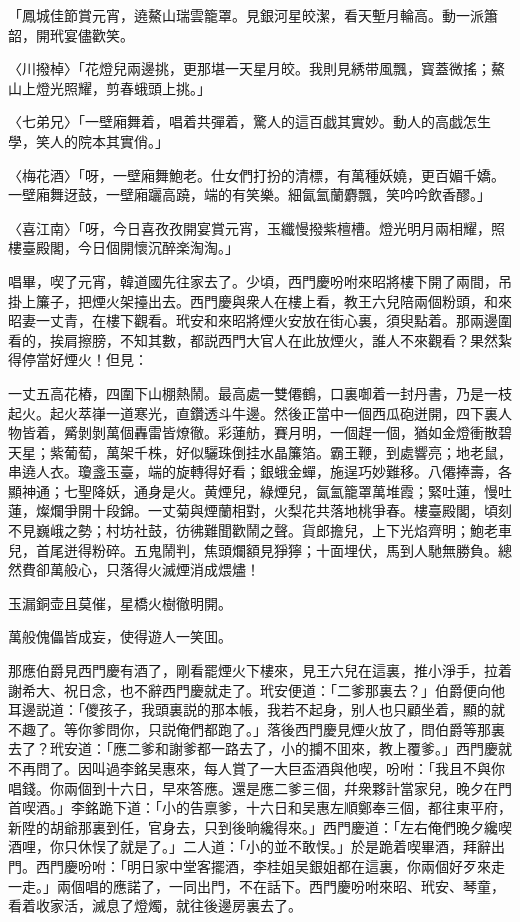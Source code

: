 「鳳城佳節賞元宵，遶鰲山瑞雲籠罩。見銀河星皎潔，看天塹月輪高。動一派簫韶，開玳宴儘歡笑。

〈川撥棹〉「花燈兒兩邊挑，更那堪一天星月皎。我則見綉带風飄，寳蓋微搖；鰲山上燈光照耀，剪春蛾頭上挑。」

〈七弟兄〉「一壁廂舞着，唱着共彈着，驚人的這百戯其實妙。動人的高戯怎生學，笑人的院本其實俏。」

〈梅花酒〉「呀，一壁廂舞鮑老。仕女們打扮的清標，有萬種妖嬈，更百媚千嬌。一壁廂舞迓鼓，一壁廂躧高蹺，端的有笑樂。細氤氳蘭麝飄，笑吟吟飲香醪。」

〈喜江南〉「呀，今日喜孜孜開宴賞元宵，玉纖慢撥紫檀槽。燈光明月兩相耀，照樓臺殿閣，今日個開懷沉醉楽淘淘。」

唱畢，喫了元宵，韓道國先往家去了。少頃，西門慶吩咐來昭將樓下開了兩間，吊掛上簾子，把煙火架擡出去。西門慶與衆人在樓上看，教王六兒陪兩個粉頭，和來昭妻一丈青，在樓下觀看。玳安和來昭將煙火安放在街心裏，須臾點着。那兩邊圍看的，挨肩擦膀，不知其數，都説西門大官人在此放煙火，誰人不來觀看？果然紮得停當好煙火！但見：

一丈五高花樁，四圍下山棚熱鬧。最高處一雙僊鶴，口裏啣着一封丹書，乃是一枝起火。起火萃嵂一道寒光，直鑽透斗牛邊。然後正當中一個西瓜砲迸開，四下裏人物皆着，觱剝剝萬個轟雷皆燎徹。彩蓮舫，賽月明，一個趕一個，猶如金燈衝散碧天星；紫葡萄，萬架千株，好似驪珠倒挂水晶簾箔。霸王鞭，到處響亮；地老鼠，串遶人衣。瓊盞玉臺，端的旋轉得好看；銀蛾金蟬，施逞巧妙難移。八僊捧壽，各顯神通；七聖降妖，通身是火。黄煙兒，綠煙兒，氤氳籠罩萬堆霞；緊吐蓮，慢吐蓮，燦爛爭開十段錦。一丈菊與煙蘭相對，火梨花共落地桃爭春。樓臺殿閣，頃刻不見巍峨之勢；村坊社鼓，彷彿難聞歡鬧之聲。貨郎擔兒，上下光焰齊明；鮑老車兒，首尾迸得粉碎。五鬼鬧判，焦頭爛額見猙獰；十面埋伏，馬到人馳無勝負。總然費卻萬般心，只落得火滅煙消成煨燼！

玉漏銅壶且莫催，星橋火樹徹明開。

萬般傀儡皆成妄，使得遊人一笑囬。

那應伯爵見西門慶有酒了，剛看罷煙火下樓來，見王六兒在這裏，推小淨手，拉着謝希大、祝日念，也不辭西門慶就走了。玳安便道：「二爹那裏去？」伯爵便向他耳邊説道：「儍孩子，我頭裏説的那本帳，我若不起身，别人也只顧坐着，顯的就不趣了。等你爹問你，只説俺們都跑了。」落後西門慶見煙火放了，問伯爵等那裏去了？玳安道：「應二爹和謝爹都一路去了，小的攔不囬來，教上覆爹。」西門慶就不再問了。因叫過李銘吴惠來，每人賞了一大巨盃酒與他喫，吩咐：「我且不與你唱錢。你兩個到十六日，早來答應。還是應二爹三個，幷衆夥計當家兒，晚夕在門首喫酒。」李銘跪下道：「小的告禀爹，十六日和吴惠左順鄭奉三個，都往東平府，新陞的胡爺那裏到任，官身去，只到後晌纔得來。」西門慶道：「左右俺們晚夕纔喫酒哩，你只休悮了就是了。」二人道：「小的並不敢悮。」於是跪着喫畢酒，拜辭出門。西門慶吩咐：「明日家中堂客擺酒，李桂姐吴銀姐都在這裏，你兩個好歹來走一走。」兩個唱的應諾了，一同出門，不在話下。西門慶吩咐來昭、玳安、琴童，看着收家活，滅息了燈燭，就往後邊房裏去了。

